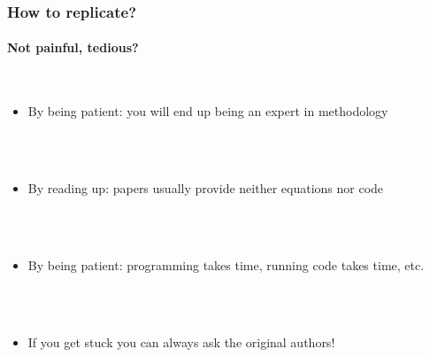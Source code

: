 \documentclass{beamer}
\begin{document}
\begin{frame}[fragile]
\frametitle{How to replicate?}
\framesubtitle{Not painful, tedious?}
        \  \\

\begin{itemize}
\item<2-> By being patient: you will end up being an expert in methodology

\ \\

\ \\

 \item <3-> By reading up: papers usually provide neither equations nor code
 
\ \\

 \ \\
 
\item<4->  By being patient: programming takes time, running code takes time, etc.

 
\ \\

 \ \\
 
\item<5-> If you get stuck you can always ask the original authors!
\end{itemize}


\end{frame}
\end{document}
